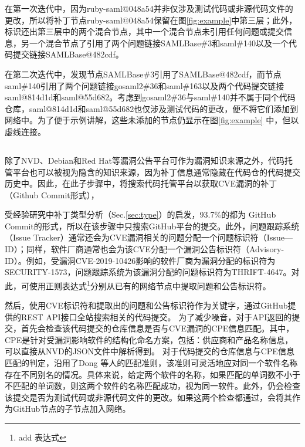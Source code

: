 \begin{exmp}
在第一次迭代中，因为ruby-saml@048a54并非仅涉及测试代码或非源代码文件的更改，所以\tool 将补丁节点ruby-saml@048a54保留在图\ref{fig:example}中第三层；此外，\tool 标识还出第三层中的两个混合节点，其中一个混合节点未引用任何问题或提交信息，另一个混合节点了引用了两个问题链接SAMLBase\#3和saml\#140以及一个代码提交链接SAMLBase@482cdf。 

在第二次迭代中，\tool 发现节点SAMLBase\#3引用了SAMLBase@482cdf，而节点saml\#140引用了两个问题链接gosaml2\#36和saml\#163以及两个代码提交链接saml@814d1d和saml@55d682。考虑到gosaml2\#36与saml\#140并不属于同个代码仓库，saml@814d1d和saml@55d682也仅涉及测试代码的更改，\tool 便不将它们添加到网络中。为了便于示例讲解，这些未添加的节点仍显示在图\ref{fig:example} 中，但以虚线连接。 %
\end{exmp}

\subsection{}
除了NVD、Debian和Red Hat等漏洞公告平台可作为漏洞知识来源之外，代码托管平台也可以被视为隐含的知识来源，因为补丁信息通常隐藏在代码仓的代码提交历史中。因此，在此子步骤中，\tool 将搜索代码托管平台以获取CVE漏洞的补丁（Github Commit形式），

受经验研究中补丁类型分析（Sec.\ref{sec:type}）的启发，93.7\%的都为 GitHub Commit的形式，所以在该步骤中\tool 只搜索GitHub平台的提交。此外，问题跟踪系统（Issue Tracker）通常还会为CVE漏洞相关的问题分配一个问题标识符（Issue—ID）；同样，软件厂商通常也会为该CVE分配一个漏洞公告标识符（Advisory-ID）。例如，受漏洞CVE-2019-10426影响的软件厂商为漏洞分配的标识符为SECURITY-1573\cite{SECURITY-1573}，问题跟踪系统为该漏洞分配的问题标识符为THRIFT-4647\cite{THRIFT-4647}。对此，\tool 可使用正则表达式\footnote{add 表达式}分别从已有的网络节点中提取问题和公告标识符。

然后，\tool 使用CVE标识符和提取出的问题和公告标识符作为关键字，通过GitHub提供的REST API\cite{github-api-1}接口全站搜索相关的代码提交。%
为了减少噪音，对于API返回的提交，\tool 首先会检查该代码提交的仓库信息是否与CVE漏洞的CPE信息匹配。其中，CPE是针对受漏洞影响软件的结构化命名方案，包括：供应商和产品名称信息，可以直接从NVD的JSON文件中解析得到。
对于代码提交的仓库信息与CPE信息匹配的判定，\tool 沿用了Dong 等人的匹配准则\cite{dong2019towards}，该准则可灵活地应对同一个软件名称存在不同别名的情况。具体来说，给定两个软件的名称，如果匹配的单词数不小于不匹配的单词数，则这两个软件的名称匹配成功，视为同一软件。此外，\tool 仍会检查该提交是否为测试代码或非源代码文件的更改。如果这两个检查都通过，\tool 会将其作为GitHub节点的子节点加入网络。

